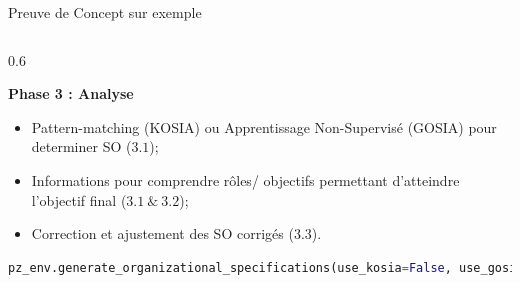     \begin{frame}[fragile]{Preuve de Concept sur exemple}
    
    \begin{columns}
    
        \begin{column}{0.6\textwidth}
    
            \textbf{Phase 3 : Analyse}
    
            \begin{itemize}
                \item Pattern-matching (KOSIA) ou Apprentissage Non-Supervisé (GOSIA) pour determiner SO ($3.1$);
                \item Informations pour comprendre rôles/ objectifs permettant d'atteindre l'objectif final ($3.1 \ \& \ 3.2$);
                \item Correction et ajustement des SO corrigés ($3.3$).
            \end{itemize}

            \begin{lstlisting}[language=Python,basicstyle=\scriptsize]
pz_env.generate_organizational_specifications(use_kosia=False, use_gosia=True,gosia_configuration={"generate_figures": True})
            \end{lstlisting}

        \end{column}
    

\end{columns}
\end{frame}
